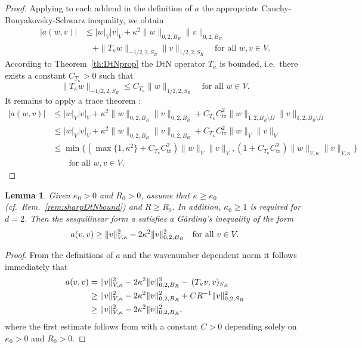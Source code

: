 \documentclass[12pt,DIV=14]{scrartcl}
\newtheorem{lemma}[definition]{Lemma}
\let\Re\relax\DeclareMathOperator{\Re}{Re}
\providecommand{\Om}{\Omega}
\begin{document}
\begin{proof}
Applying to each addend in the definition of $a$ the appropriate
Cauchy-Bunyakovsky-Schwarz inequality, we obtain
\begin{align*}
|a(w,v)| &\le |w|_V |v|_V
+ \kappa^2 \|w\|_{0,2,B_R}\|v\|_{0,2,B_R}\\
&\quad + \|T_\kappa w\|_{-1/2,2,S_R} \|v\|_{1/2,2,S_R}
\quad\text{for all } w,v\in V.
\end{align*}
According to Theorem~\ref{th:DtNprop} the DtN operator $T_\kappa$ is bounded,
i.e.\ there exists a constant $C_{T_\kappa} > 0$ such that
\[
\|T_\kappa w\|_{-1/2,2,S_R} \le C_{T_\kappa} \|w\|_{1/2,2,S_R}
\quad\text{for all }
w\in V.
\]
It remains to apply a trace theorem \cite[Thm.~3.37]{McLean:00}:
\begin{align*}
|a(w,v)|
&\le|w|_V |v|_V + \kappa^2 \|w\|_{0,2,B_R}\|v\|_{0,2,B_R}
+ C_{T_\kappa} C_\mathrm{tr}^2
\|w\|_{1,2,B_R\setminus\overline\Om} \|v\|_{1,2,B_R\setminus\overline\Om}\\
&\le |w|_V |v|_V + \kappa^2 \|w\|_{0,2,B_R}\|v\|_{0,2,B_R}
+ C_{T_\kappa} C_\mathrm{tr}^2\|w\|_V \|v\|_V\\
&\le \min\{(\max\{1,\kappa^2\} + C_{T_\kappa} C_\mathrm{tr}^2)\|w\|_V \|v\|_V,
(1 + C_{T_\kappa} C_\mathrm{tr}^2)\|w\|_{V,\kappa} \|v\|_{V,\kappa}\}\\
&\qquad\text{for all } w,v\in V.
\end{align*}
\end{proof}

\begin{lemma}\label{l:contGarding}
Given $\kappa_0>0$ and $R_0>0$,
assume that $\kappa \ge \kappa_0$ (cf.\ Rem.~\ref{rem:sharpDtNbound}) and $R \ge R_0$.
In addition, $\kappa_0\ge 1$ is required for $d=2$.
Then the sesquilinear form a satisfies a G{\aa}rding's inequality of the form
\[
\Re a(v,v) \ge \|v\|_{V,\kappa}^2 - 2\kappa^2 \|v\|_{0,2,B_R}^2
\quad\text{for all } v\in V.
\]
\end{lemma}
\begin{proof}
From the definitions of $a$ and the wavenumber dependent norm it follows immediately that
\begin{align*}
\Re a(v,v) &=\|v\|_{V,\kappa}^2 - 2\kappa^2 \|v\|_{0,2,B_R}^2 - \Re\,(T_\kappa v,v)_{S_R}\\
&\ge \|v\|_{V,\kappa}^2 - 2\kappa^2 \|v\|_{0,2,B_R}^2 + CR^{-1}\|v\|_{0,2,S_R}^2\\
&\ge \|v\|_{V,\kappa}^2 - 2\kappa^2 \|v\|_{0,2,B_R}^2,
\end{align*}
where the first estimate follows from \cite[Lemma~3.3]{Melenk:10} with a constant $C>0$
depending solely on $\kappa_0>0$ and $R_0>0$.
\end{proof}
\end{document}
